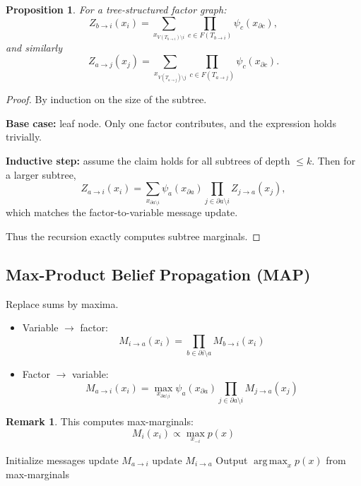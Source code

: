 \documentclass[12pt,oneside]{book}
\numberwithin{equation}{section}
\theoremstyle{definition}
\newtheorem{remark}{Remark}[section]
\theoremstyle{plain}
\newtheorem{proposition}{Proposition}[section]
\theoremstyle{remark}
\newcommand{\argmax}{\operatorname*{arg\,max}}
\begin{document}
\begin{proposition}
For a tree-structured factor graph:
\[
Z_{b \to i}(x_i)
=
\sum_{x_{V(T_{b \to i}) \setminus i}}
\prod_{c \in F(T_{b \to i})} \psi_c(x_{\partial c}),
\]
and similarly
\[
Z_{a \to j}(x_j)
=
\sum_{x_{V(T_{a \to j}) \setminus j}}
\prod_{c \in F(T_{a \to j})} \psi_c(x_{\partial c}).
\]
\end{proposition}

\begin{proof}
By induction on the size of the subtree.

\textbf{Base case:} leaf node. Only one factor contributes, and the expression holds trivially.

\textbf{Inductive step:} assume the claim holds for all subtrees of depth $\le k$.  
Then for a larger subtree,
\[
Z_{a \to i}(x_i)
=
\sum_{x_{\partial a \setminus i}}
\psi_a(x_{\partial a})
\prod_{j \in \partial a \setminus i} Z_{j \to a}(x_j),
\]
which matches the factor-to-variable message update.

Thus the recursion exactly computes subtree marginals.
\end{proof}


\subsection*{Max-Product Belief Propagation (MAP)}

Replace sums by maxima.

\begin{itemize}
\item Variable $\to$ factor:
\[
M_{i \to a}(x_i)
=
\prod_{b \in \partial i \setminus a} M_{b \to i}(x_i)
\]

\item Factor $\to$ variable:
\[
M_{a \to i}(x_i)
=
\max_{x_{\partial a \setminus i}}
\psi_a(x_{\partial a})
\prod_{j \in \partial a \setminus i} M_{j \to a}(x_j)
\]
\end{itemize}

\begin{remark}
This computes max-marginals:
\[
M_i(x_i) \propto \max_{x_{-i}} p(x)
\]
\end{remark}


\begin{algorithm}
\caption{Max-product belief propagation}
\begin{algorithmic}
\State Initialize messages
\Repeat
        \State update $M_{a \to i}$
    \EndFor
        \State update $M_{i \to a}$
    \EndFor
{}
\State Output $\argmax_x p(x)$ from max-marginals
\end{algorithmic}
\end{algorithm}
\end{document}
